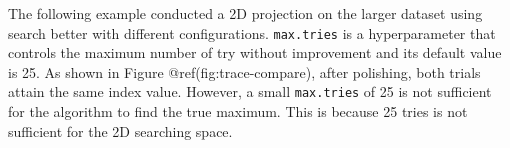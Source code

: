 \documentclass[12pt]{article}
\newenvironment{Shaded}{\begin{snugshade}}{\end{snugshade}}
\newcommand{\DataTypeTok}[1]{\textcolor[rgb]{0.13,0.29,0.53}{#1}}
\newcommand{\DecValTok}[1]{\textcolor[rgb]{0.00,0.00,0.81}{#1}}
\newcommand{\KeywordTok}[1]{\textcolor[rgb]{0.13,0.29,0.53}{\textbf{#1}}}
\newcommand{\NormalTok}[1]{#1}
\newcommand{\OperatorTok}[1]{\textcolor[rgb]{0.81,0.36,0.00}{\textbf{#1}}}
\newcommand{\OtherTok}[1]{\textcolor[rgb]{0.56,0.35,0.01}{#1}}
\newcommand{\StringTok}[1]{\textcolor[rgb]{0.31,0.60,0.02}{#1}}
\begin{document}
\begin{Shaded}
\end{Shaded}

The following example conducted a 2D projection on the larger dataset
using search better with different configurations. \texttt{max.tries} is
a hyperparameter that controls the maximum number of try without
improvement and its default value is 25. As shown in Figure
@ref(fig:trace-compare), after polishing, both trials attain the same
index value. However, a small \texttt{max.tries} of 25 is not sufficient
for the algorithm to find the true maximum. This is because 25 tries is
not sufficient for the 2D searching space.
\end{document}
